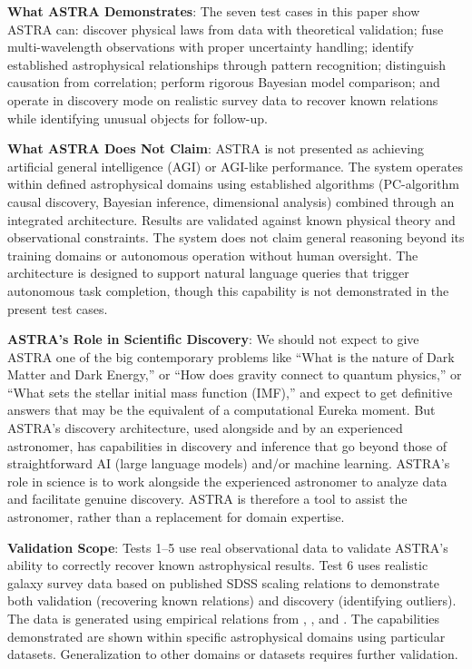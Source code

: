 \documentclass[usenatbib]{rasti}
\begin{document}
\textbf{What ASTRA Demonstrates}: The seven test cases in this paper show ASTRA can: discover physical laws from data with theoretical validation; fuse multi-wavelength observations with proper uncertainty handling; identify established astrophysical relationships through pattern recognition; distinguish causation from correlation; perform rigorous Bayesian model comparison; and operate in discovery mode on realistic survey data to recover known relations while identifying unusual objects for follow-up.

\textbf{What ASTRA Does Not Claim}: ASTRA is not presented as achieving artificial general intelligence (AGI) or AGI-like performance. The system operates within defined astrophysical domains using established algorithms (PC-algorithm causal discovery, Bayesian inference, dimensional analysis) combined through an integrated architecture. Results are validated against known physical theory and observational constraints. The system does not claim general reasoning beyond its training domains or autonomous operation without human oversight. The architecture is designed to support natural language queries that trigger autonomous task completion, though this capability is not demonstrated in the present test cases.

\textbf{ASTRA's Role in Scientific Discovery}: We should not expect to give ASTRA one of the big contemporary problems like ``What is the nature of Dark Matter and Dark Energy,'' or ``How does gravity connect to quantum physics,'' or ``What sets the stellar initial mass function (IMF),'' and expect to get definitive answers that may be the equivalent of a computational Eureka moment. But ASTRA's discovery architecture, used alongside and by an experienced astronomer, has capabilities in discovery and inference that go beyond those of straightforward AI (large language models) and/or machine learning. ASTRA's role in science is to work alongside the experienced astronomer to analyze data and facilitate genuine discovery. ASTRA is therefore a tool to assist the astronomer, rather than a replacement for domain expertise.

\textbf{Validation Scope}: Tests 1--5 use real observational data to validate ASTRA's ability to correctly recover known astrophysical results. Test 6 uses realistic galaxy survey data based on published SDSS scaling relations to demonstrate both validation (recovering known relations) and discovery (identifying outliers). The data is generated using empirical relations from \citet{kauffmann2003}, \citet{tremonti2004}, and \citet{brinchmann2004}. The capabilities demonstrated are shown within specific astrophysical domains using particular datasets. Generalization to other domains or datasets requires further validation.
\end{document}
